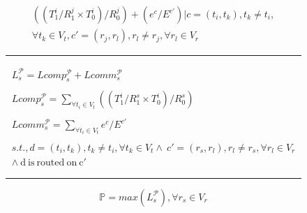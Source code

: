 \documentclass[10pt, conference, compsocconf, reqno]{IEEEtran}
\begin{document}
\begin{figure}[ht!]
\begin{scriptsize}

  \vspace{0.5cm}

  \begin{equation}
    \label{eq:3}
    \begin{array}{c}

      ((T^i_1/R^j_1\times T^i_0)/R^j_0)
      + (e^c/E^{c'}) | c = (t_i,t_k), t_k \neq t_i, \\ \forall t_k \in V_t, c' =
      (r_j,r_l), r_l \neq r_j, \forall r_l \in V_r

    \end{array}
  \end{equation}

  \rule{8.6cm}{0.4pt}

  \begin{equation}
    \label{eq:1}
    \begin{array}{c}
      L^{\mathcal{P}}_s = Lcomp^{\mathcal{P}}_s +
      Lcomm^{\mathcal{P}}_s\\
      \\Lcomp^{\mathcal{P}}_s =
      \sum_{\forall t_i \in V_t} ((T^i_1/R^s_1\times T^i_0)/R^s_0)\\
      \\Lcomm^{\mathcal{P}}_s =
      \sum_{\forall t_i \in V_t} e^c / E^{c'}\\
      \\s.t., d = (t_i,t_k), t_k \neq t_i, \forall t_k
      \in V_t \wedge\  c' = (r_s,r_l), r_l \neq r_s, \forall r_l \in V_r \\
      \wedge\ \mathrm{d\ is\ routed\ on\ c'}
    \end{array}
  \end{equation}

  \rule{8.6cm}{0.4pt}

  \begin{equation}
    \label{eq:2}
    \mathbb{P} = max ({L^{\mathcal{P}}_s}), \forall r_s \in V_r
  \end{equation}

\end{scriptsize}
\end{figure}
\end{document}

